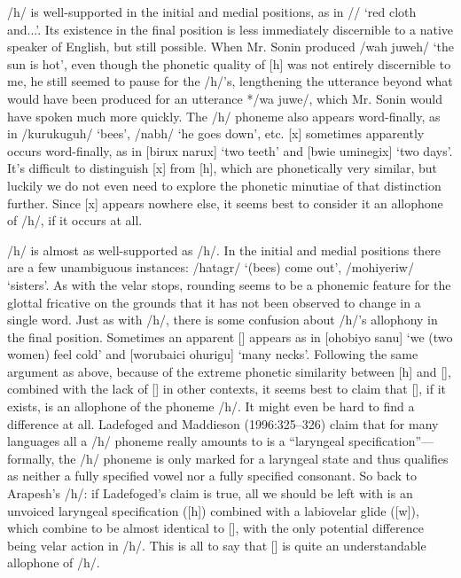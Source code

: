 \documentclass[pdftex,12pt,letterpaper]{article}
\let\ipa\textipa
\def\sw{\ipa{\super w}}
\begin{document}
 /h/ is well-supported in the initial and medial positions, as in /\ipa{ahwi aropa hani}/ `red cloth and...'. Its existence in the final position is less immediately discernible to a native speaker of English, but still possible. When Mr. Sonin produced /wah juweh/ `the sun is hot', even though the phonetic quality of [h] was not entirely discernible to me, he still seemed to pause for the /h/'s, lengthening the utterance beyond what would have been produced for an utterance */wa juwe/, which Mr. Sonin would have spoken much more quickly. The /h/ phoneme also appears word-finally, as in /kurukuguh/ `bees', /nab\ipa{1}h/ `he goes down', etc. [x] sometimes apparently occurs word-finally, as in [bi\ipa{@}rux narux] `two teeth' and [bwie \ipa{\textltailn}umineg\sw ix] `two days'. It's difficult to distinguish [x] from [h], which are phonetically very similar, but luckily we do not even need to explore the phonetic minutiae of that distinction further. Since [x] appears nowhere else, it seems best to consider it an allophone of /h/, if it occurs at all.
 
 /h\sw/ is almost as well-supported as /h/. In the initial and medial positions there are a few unambiguous instances: /h\sw atag\ipa{1}r/ `(bees) come out', /moh\sw iyeriw/ `sisters'. As with the velar stops, rounding seems to be a phonemic feature for the glottal fricative on the grounds that it has not been observed to change in a single word. Just as with /h/, there is some confusion about /h\sw/'s allophony in the final position. Sometimes an apparent [\ipa{F}] appears as in [ohobiyo\ipa{F} \ipa{\textltailn uman@g@s} sanu\ipa{F}] `we (two women) feel cold' and [worubaici ohurigu\ipa{F}] `many necks'. Following the same argument as above, because of the extreme phonetic similarity between [h\sw] and [\ipa{F}], combined with the lack of [\ipa{F}] in other contexts, it seems best to claim that [\ipa{F}], if it exists, is an allophone of the phoneme /h\sw/. It might even be hard to find a difference at all. Ladefoged and Maddieson (1996:325--326) claim that for many languages all a /h/ phoneme really amounts to is a ``laryngeal specification''---formally, the /h/ phoneme is only marked for a laryngeal state and thus qualifies as neither a fully specified vowel nor a fully specified consonant. So back to Arapesh's /h\sw/: if Ladefoged's claim is true, all we should be left with is an unvoiced laryngeal specification ([h]) combined with a labiovelar glide ([w]), which combine to be almost identical to [\ipa{F}], with the only potential difference being velar action in /h\sw/. This is all to say that [\ipa{F}] is quite an understandable allophone of /h\sw/.  %
 
\end{document}
